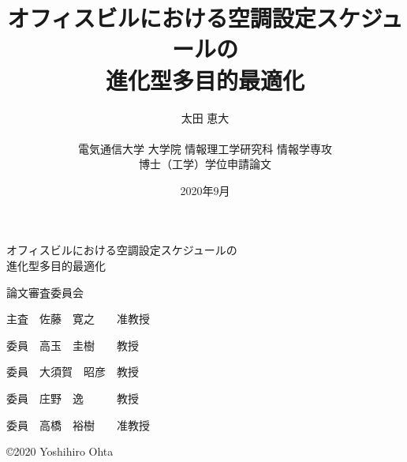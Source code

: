 \documentclass[a4paper, 12pt,dvipdfmx]{jsbook}
\title{オフィスビルにおける空調設定スケジュールの\\
	進化型多目的最適化}
\author{太田 恵大\\ 　
\\電気通信大学 大学院 情報理工学研究科 情報学専攻\\
	博士（工学）学位申請論文}
\date{2020年9月}
\begin{document}

\maketitle
\clearpage

\vspace*{30mm}
\thispagestyle{empty}
\begin{center}
	\LARGE オフィスビルにおける空調設定スケジュールの\\進化型多目的最適化 \par
	\vspace{50mm}
\end{center}
\begin{flushright}
	\Large 論文審査委員会　　　　　　 \par
	\vspace{5mm}
	\Large 主査　佐藤　寛之　　准教授 \par
	\Large 委員　高玉　圭樹　　教授　 \par
	\Large 委員　大須賀　昭彦　教授　 \par
	\Large 委員　庄野　逸　　　教授　 \par
	\Large 委員　高橋　裕樹　　准教授 \par
	\vspace{10mm}
\end{flushright}
\clearpage

\begin{center}
	\vspace*{80mm}
	\large \copyright 2020 Yoshihiro Ohta \par
\end{center}
\thispagestyle{empty}
\clearpage
\end{document}
